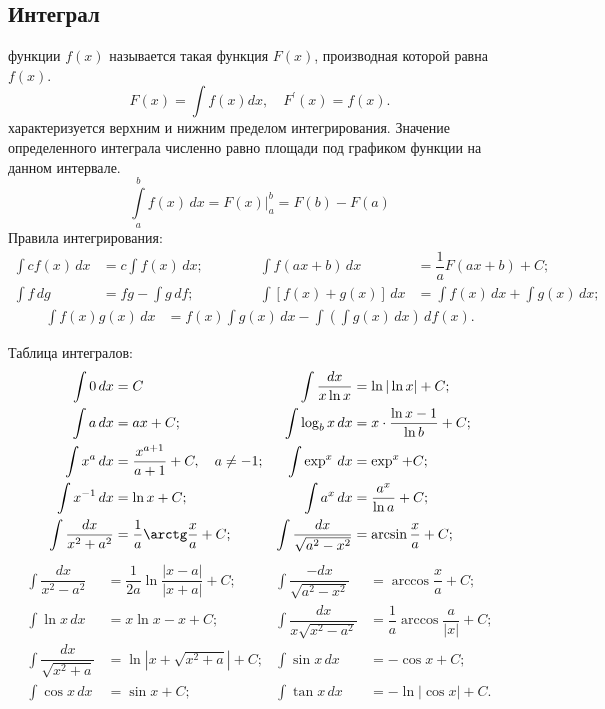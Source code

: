 \subsection{Интеграл}
 функции $f(x)$ называется такая функция $F(x)$, производная которой равна $f(x)$.
\begin{equation}
F(x) = \int f(x)dx,\quad F^\prime(x)=f(x).
\end{equation}
 характеризуется верхним и нижним пределом интегрирования. Значение определенного интеграла численно равно площади под графиком функции на данном интервале.
\begin{equation}
\int\limits^b_a f(x)\,dx = F(x) \biggr|^b_a = F(b) - F(a)
\end{equation}
Правила интегрирования:
\begin{align*}
\int c f(x) \,dx &= c \int f(x) \,dx;  &&&&&\int f(ax + b) \,dx &= \dfrac{1}{a}F(ax + b) + C;\\
\int f \,dg &= fg - \int g \,df; &&&&& \int \left[f(x) + g(x)\right] \,dx &= \int f(x) \,dx + \int g(x) \,dx;
\end{align*}
\begin{align*}
\int f(x) g(x) \,dx &= f(x) \int g(x) \,dx - \int\left(\int g(x) \,dx \right) \,df(x). 
\end{align*}

Таблица интегралов:
\begin{align*}
\int 0 \,dx &= C & \int \dfrac{dx}{x \ln x} &= \ln |\ln x| + C; \\
\int a \,dx &= ax + C; & \int \log_b x \,dx &= x\cdot \dfrac{\ln x - 1}{\ln b} + C;\\
\int x^a \,dx &= \dfrac{x^{a+1}}{a+1} + C,\quad a \neq -1; & \int \exp^x \,dx &= \exp^x + C; \\
\int x^{-1} \,dx &= \ln x + C; & \int a^x \,dx &= \dfrac{a^x}{\ln a} + C;\\
\int \dfrac{dx}{x^2 + a^2} &= \dfrac{1}{a} \arctg \dfrac{x}{a} + C; & \int \dfrac{dx}{\sqrt{a^2 - x^2}} &= \arcsin\dfrac{x}{a} + C;\\
\end{align*}
\begin{align*}
\int \dfrac{dx}{x^2 - a^2} &= \dfrac{1}{2a} \ln \dfrac{|x - a|}{|x + a|} + C; & \int \dfrac{-dx}{\sqrt{a^2 - x^2}} &= \arccos\dfrac{x}{a} + C;\\
\int \ln x \,dx &= x \ln x - x + C; & \int \dfrac{dx}{x \sqrt{x^2 - a^2}} &= \dfrac{1}{a}\arccos\dfrac{a}{|x|} + C;\\
\int \dfrac{dx}{\sqrt{x^2 + a}} &= \ln|x + \sqrt{x^2 + a}| + C; & \int \sin x \,dx &= -\cos x + C;\\
\int \cos x \,dx &= \sin x + C; & \int \tan x \,dx &= - \ln|\cos x| + C.
\end{align*}
